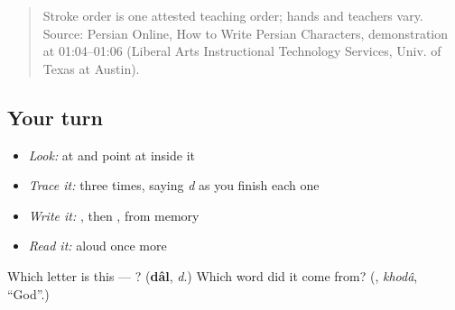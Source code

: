 \begin{quote}
Stroke order is one attested teaching order; hands and teachers vary. Source: Persian Online, How to Write Persian Characters,  demonstration at 01:04–01:06 (Liberal Arts Instructional Technology Services, Univ. of Texas at Austin).
\end{quote}

\subsection*{Your turn}
\begin{itemize}
\raggedright
  \item \emph{Look:} at \textbf{} and point at  inside it
  \item \emph{Trace it:}  three times, saying \emph{d} as you finish each one
  \item \emph{Write it:} , then , from memory
  \item \emph{Read it:} \textbf{} aloud once more
\end{itemize}

\begin{tcolorbox}[breakable,colback=teal!4,colframe=teal!35!black,title={Before you move on}]
Which letter is this — ? (\textbf{dâl}, \emph{d}.) Which word did it come from? (\textbf{}, \emph{khodâ}, \textquotedblleft{}God\textquotedblright{}.)
\end{tcolorbox}
